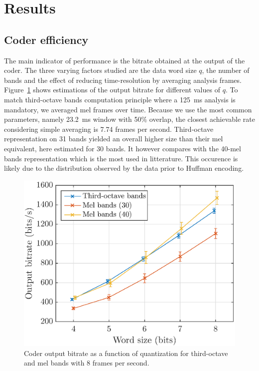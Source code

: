 \documentclass[final,3p,times,twocolumn]{elsarticle}
\begin{document}
\section{Results} \label{sec:results}

\subsection{Coder efficiency}

The main indicator of performance is the bitrate obtained at the output of the coder. The three varying factors studied are the data word size $q$, the number of bands and the effect of reducing time-resolution by averaging analysis frames. Figure~\ref{fig:bitrate_q} shows estimations of the output bitrate for different values of $q$. To match third-octave bands computation principle where a 125~ms analysis is mandatory, we averaged mel frames over time. Because we use the most common parameters, namely 23.2~ms window with 50\% overlap, the closest achievable rate considering simple averaging is 7.74 frames per second. Third-octave representation on 31 bands yielded an overall higher size than their mel equivalent, here estimated for 30 bands. It however compares with the 40-mel bands representation which is the most used in litterature. This occurence is likely due to the distribution observed by the data prior to Huffman encoding.

\begin{figure}[htbp]
	\centering
		\includegraphics[width=\columnwidth]{figures/bitrate_qall.eps}
	\caption{Coder output bitrate as a function of quantization for third-octave and mel bands with 8 frames per second.}
	\label{fig:bitrate_q}
\end{figure}
\end{document}
